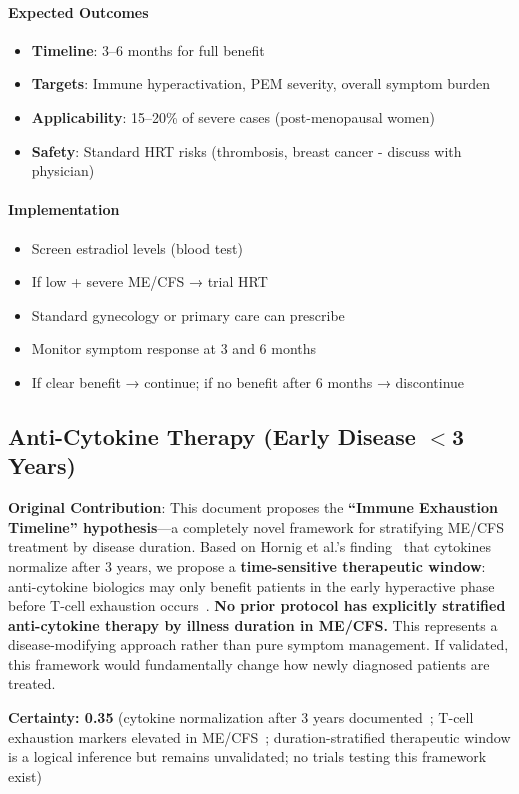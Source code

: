 \paragraph{Expected Outcomes}
\begin{itemize}
    \item \textbf{Timeline}: 3--6 months for full benefit
    \item \textbf{Targets}: Immune hyperactivation, PEM severity, overall symptom burden
    \item \textbf{Applicability}: 15--20\% of severe cases (post-menopausal women)
    \item \textbf{Safety}: Standard HRT risks (thrombosis, breast cancer - discuss with physician)
\end{itemize}

\paragraph{Implementation}
\begin{itemize}
    \item Screen estradiol levels (blood test)
    \item If low + severe ME/CFS → trial HRT
    \item Standard gynecology or primary care can prescribe
    \item Monitor symptom response at 3 and 6 months
    \item If clear benefit → continue; if no benefit after 6 months → discontinue
\end{itemize}

\subsection{Anti-Cytokine Therapy (Early Disease $<$3 Years)}
\label{sec:anti-cytokine}

\begin{hypothesis}
\label{hyp:immune-exhaustion-timeline}
\textbf{Original Contribution}: This document proposes the \textbf{``Immune Exhaustion Timeline'' hypothesis}---a completely novel framework for stratifying ME/CFS treatment by disease duration. Based on Hornig et al.'s finding~\cite{Hornig2015} that cytokines normalize after 3 years, we propose a \textbf{time-sensitive therapeutic window}: anti-cytokine biologics may only benefit patients in the early hyperactive phase before T-cell exhaustion occurs~\cite{iu2024tcell_exhaustion}. \textbf{No prior protocol has explicitly stratified anti-cytokine therapy by illness duration in ME/CFS.} This represents a disease-modifying approach rather than pure symptom management. If validated, this framework would fundamentally change how newly diagnosed patients are treated.

\textbf{Certainty: 0.35} (cytokine normalization after 3 years documented~\cite{Hornig2015}; T-cell exhaustion markers elevated in ME/CFS~\cite{iu2024tcell_exhaustion}; duration-stratified therapeutic window is a logical inference but remains unvalidated; no trials testing this framework exist)
\end{hypothesis}

